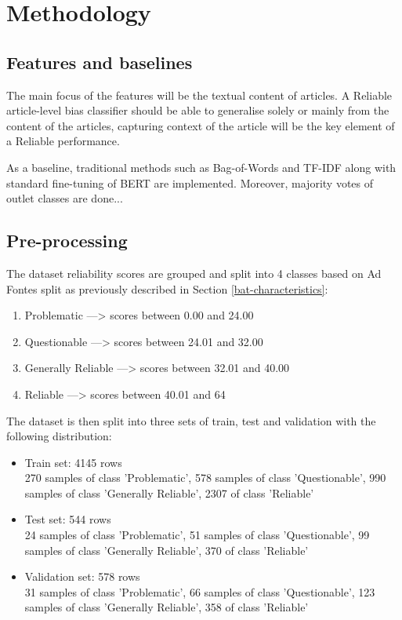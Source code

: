 \chapter{Methodology}
\label{cha:5}

\section{Features and baselines}

The main focus of the features will be the textual content of articles. A Reliable article-level bias classifier should be able to generalise solely or mainly from the content of the articles, capturing context of the article will be the key element of a Reliable performance.

As a baseline, traditional methods such as Bag-of-Words and TF-IDF along with standard fine-tuning of BERT are implemented. Moreover, majority votes of outlet classes are done...

\section{Pre-processing}

The dataset reliability scores are grouped and split into 4 classes based on Ad Fontes split as previously described in Section \ref{bat-characteristics}:
\begin{enumerate}
    \item Problematic ---> scores between 0.00 and 24.00
    \item Questionable ---> scores between 24.01 and 32.00
    \item Generally Reliable ---> scores between 32.01 and 40.00
    \item Reliable ---> scores between 40.01 and 64
\end{enumerate}

The dataset is then split into three sets of train, test and validation with the following distribution:
\begin{itemize}
    \item Train set: 4145 rows \\
          270 samples of class 'Problematic', 578 samples of class 'Questionable', 990 samples of class 'Generally Reliable', 2307 of class 'Reliable'
    \item Test set: 544 rows \\
          24 samples of class 'Problematic', 51 samples of class 'Questionable', 99 samples of class 'Generally Reliable', 370 of class 'Reliable'
    \item Validation set: 578 rows \\
          31 samples of class 'Problematic', 66 samples of class 'Questionable', 123 samples of class 'Generally Reliable', 358 of class 'Reliable'
\end{itemize}

